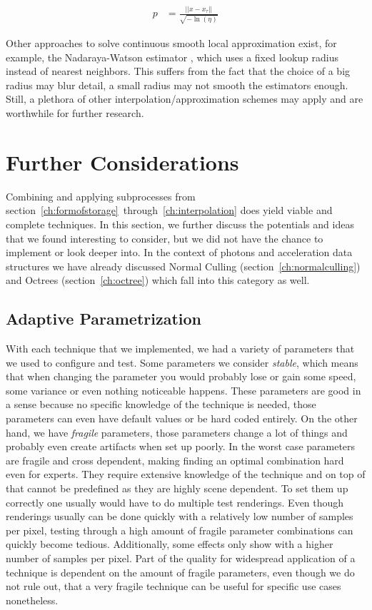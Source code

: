 \begin{align}
p &= \frac{||x-x_\tau||}{\sqrt{-\ln(\eta)}} \label{eq:p0}
\end{align}

Other approaches to solve continuous smooth local approximation exist, for example, the Nadaraya-Watson estimator \parencite{nadaraya1964estimating}, which uses a fixed lookup radius instead of nearest neighbors. This suffers from the fact that the choice of a big radius may blur detail, a small radius may not smooth the estimators enough. Still, a plethora of other interpolation/approximation schemes may apply and are worthwhile for further research.


\section{Further Considerations}

Combining and applying subprocesses from section~\ref{ch:formofstorage}~through~\ref{ch:interpolation} does yield viable and complete techniques. In this section, we further discuss the potentials and ideas that we found interesting to consider, but we did not have the chance to implement or look deeper into. In the context of photons and acceleration data structures we have already discussed Normal Culling (section~\ref{ch:normalculling}) and Octrees (section~\ref{ch:octree}) which fall into this category as well.

\subsection{Adaptive Parametrization}

With each technique that we implemented, we had a variety of parameters that we used to configure and test. Some parameters we consider \textit{stable}, which means that when changing the parameter you would probably lose or gain some speed, some variance or even nothing noticeable happens. These parameters are good in a sense because no specific knowledge of the technique is needed, those parameters can even have default values or be hard coded entirely. On the other hand, we have \textit{fragile} parameters, those parameters change a lot of things and probably even create artifacts when set up poorly. In the worst case parameters are fragile and cross dependent, making finding an optimal combination hard even for experts. They require extensive knowledge of the technique and on top of that cannot be predefined as they are highly scene dependent. To set them up correctly one usually would have to do multiple test renderings. Even though renderings usually can be done quickly with a relatively low number of samples per pixel, testing through a high amount of fragile parameter combinations can quickly become tedious. Additionally, some effects only show with a higher number of samples per pixel. Part of the quality for widespread application of a technique is dependent on the amount of fragile parameters, even though we do not rule out, that a very fragile technique can be useful for specific use cases nonetheless.

